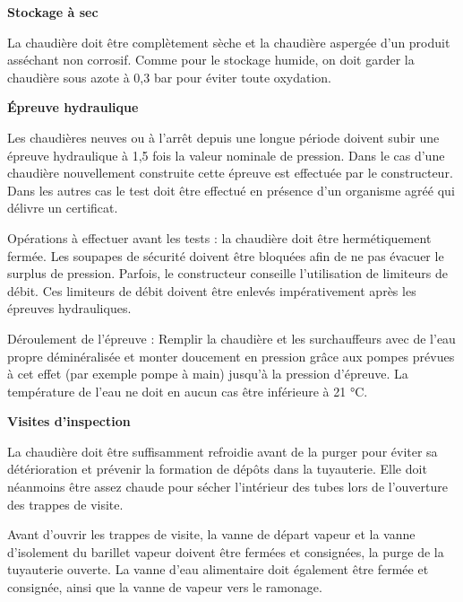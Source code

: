 \vspace{0.3cm}
\textbf{Stockage à sec}
\vspace{0.3cm}

La chaudière doit être complètement sèche et la chaudière aspergée d’un produit asséchant non corrosif. Comme pour le stockage humide, on doit garder la chaudière sous azote à 0,3 bar pour éviter toute oxydation.


\vspace{0.3cm}
\textbf{Épreuve hydraulique}
\vspace{0.3cm}

Les chaudières neuves ou à l’arrêt depuis une longue période doivent subir une épreuve hydraulique à 1,5 fois la valeur nominale de pression. Dans le cas d’une chaudière nouvellement construite cette épreuve est effectuée par le constructeur. Dans les autres cas le test doit être effectué en présence d’un organisme agréé qui délivre un certificat.
\vspace{0.3cm}

Opérations à effectuer avant les tests : la chaudière doit être hermétiquement fermée. Les soupapes de sécurité doivent être bloquées afin de ne pas évacuer le surplus de pression. Parfois, le constructeur conseille l’utilisation de limiteurs de débit. Ces limiteurs de débit doivent être enlevés impérativement après les épreuves hydrauliques.
\vspace{0.3cm}

Déroulement de l’épreuve : Remplir la chaudière et les surchauffeurs avec de l’eau propre déminéralisée et monter doucement en pression grâce aux pompes prévues à cet effet (par exemple pompe à main) jusqu’à la pression d’épreuve. La température de l’eau ne doit en aucun cas être inférieure à 21 °C.

\vspace{0.3cm}
\textbf{Visites d'inspection}
\vspace{0.3cm}

La chaudière doit être suffisamment refroidie avant de la purger pour éviter sa détérioration et prévenir la formation de dépôts dans la tuyauterie. Elle doit néanmoins être assez chaude pour sécher l’intérieur des tubes lors de l’ouverture des trappes de visite.
\vspace{0.3cm}

Avant d’ouvrir les trappes de visite, la vanne de départ vapeur et la vanne d’isolement du barillet vapeur doivent être fermées et consignées, la purge de la tuyauterie ouverte.
La vanne d’eau alimentaire doit également être fermée et consignée, ainsi que la vanne de vapeur vers le ramonage.



